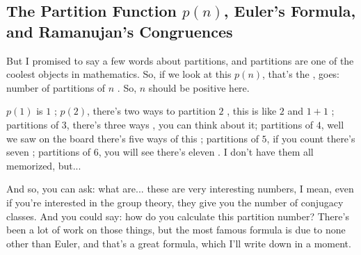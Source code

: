 \begin{hidden}
\end{hidden}

\subsection{The Partition Function \texorpdfstring{$p(n)$}{p(n)}, Euler's Formula, and Ramanujan's Congruences}

\begin{speech}[01:23:51 - 01:25:10]
But I promised to say a few words about partitions, and partitions are one of the coolest objects in mathematics. So, if we look at this $p(n)$, that's the , goes: number of partitions of $n$ . So, $n$ should be positive here.

$p(1)$ is $1$ ; $p(2)$, there's two ways to partition $2$ , this is like $2$ and $1 + 1$ ; partitions of $3$, there's three ways , you can think about it; partitions of $4$, well we saw on the board there's five ways of this ; partitions of $5$, if you count there's seven ; partitions of $6$, you will see there's eleven . I don't have them all memorized, but...

And so, you can ask: what are... these are very interesting numbers, I mean, even if you're interested in the group theory, they give you the number of conjugacy classes. And you could say: how do you calculate this partition number? There's been a lot of work on those things, but the most famous formula is due to none other than Euler, and that's a great formula, which I'll write down in a moment.
\end{speech}

